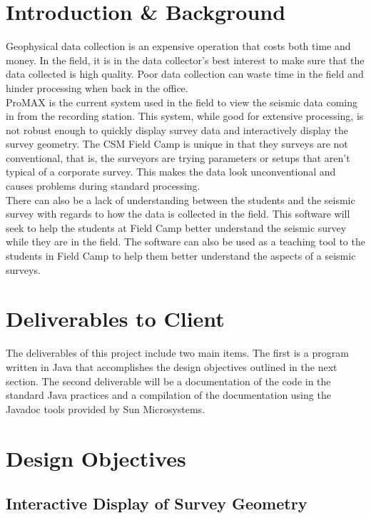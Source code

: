 \documentclass[12pt]{article}
\begin{document}
\section{Introduction \& Background}

Geophysical data collection is an expensive operation that costs both time and money. In the field, it is in the data collector's best interest to make sure that the data collected is high quality. Poor data collection can waste time in the field and hinder processing when back in the office. \\

ProMAX is the current system used in the field to view the seismic data coming in from the recording station. This system, while good for extensive processing, is not robust enough to quickly display survey data and interactively display the survey geometry. The CSM Field Camp is unique in that they surveys are not conventional, that is, the surveyors are trying parameters or setups that aren't typical of a corporate survey. This makes the data look unconventional and causes problems during standard processing. \\

There can also be a lack of understanding between the students and the seismic survey with regards to how the data is collected in the field. This software will seek to help the students at Field Camp better understand the seismic survey while they are in the field. The software can also be used as a teaching tool to the students in Field Camp to help them better understand the aspects of a seismic surveys.

\section{Deliverables to Client}

The deliverables of this project include two main items. The first is a program written in Java that accomplishes the design objectives outlined in the next section. The second deliverable will be a documentation of the code in the standard Java practices and a compilation of the documentation using the Javadoc tools provided by Sun Microsystems. 

\section{Design Objectives}
\subsection{Interactive Display of Survey Geometry}
\end{document}

